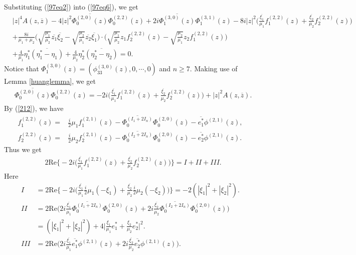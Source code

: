 \documentclass[12pt]{article}
\numberwithin{equation}{section}
\def\ov{\overline}
\begin{document}
\medskip
Substituting (\ref{97eq2}) into (\ref{97eq6}), we get
\begin{equation}\begin{split}
&|z|^4A(z,\ov{z})-4|z|^2\ov{\Phi_0^{(2,0)}(z)}\Phi_0^{(2,2)}(z)+2i\ov{\Phi_1^{(3,0)}(z)}\Phi_1^{(3,1)}(z)
-8i|z|^2\big(\frac{\ov{\xi_1}}{\mu_1}f_1^{(2,2)}(z)+\frac{\ov{\xi_2}}{\mu_2}f_2^{(2,2)}(z)\big)\\
&+\frac{8i}{\mu_1+\mu_2}\big(\sqrt{\frac{\mu_1}{\mu_2}}
\ov{z_1}\ov{\xi_2}-\sqrt{\frac{\mu_2}{\mu_1}}\ov{z_2}\ov{\xi_1}\big)\cdot
         \big(\sqrt{\frac{\mu_1}{\mu_2}}z_1f_2^{(2,2)}(z)-\sqrt{\frac{\mu_2}{\mu_1}}z_2f_1^{(2,2)}(z)\big)\\ &
         +\frac{4}{\mu_1}\eta_1^*\ov{(\eta_1^*-\eta_1)}+\frac{4}{\mu_2}\eta_2^*\ov{(\eta_2^*-\eta_2)}=0.
\end{split}\end{equation}
Notice that $\Phi_1^{(3,0)}(z)=(\phi_{33}^{(3,0)}(z),0,\cdots,0)$
and $n\ge 7$. Making use of  Lemma \ref{huanglemma}, we get
\begin{equation}\begin{split}
\label{2013 4.59} &\ov{\Phi_0^{(2,0)}(z)}\Phi_0^{(2,2)}(z)=
-2i\big(\frac{\ov{\xi_1}}{\mu_1}f_1^{(2,2)}(z)+\frac{\ov{\xi_2}}{\mu_2}f_2^{(2,2)}(z)\big)+|z|^2A(z,\ov{z}).
\end{split}\end{equation}
By (\ref{212}), we have
\begin{equation}\begin{split}
f_1^{(2,2)}(z)=&\frac{i}{2}\mu_1f_1^{(2,1)}(z)-\ov{\Phi_0^{(I_1+2I_n)}}\Phi_0^{(2,0)}(z)-\ov{e_1^*}\phi^{(2,1)}(z),\\
f_2^{(2,2)}(z)=&\frac{i}{2}\mu_2f_2^{(2,1)}(z)-\ov{\Phi_0^{(I_2+2I_n)}}\Phi_0^{(2,0)}(z)-\ov{e_2^*}\phi^{(2,1)}(z).
\end{split}\end{equation}
Thus we get
\begin{equation}\begin{split}\label{i}
&2\text{Re}\Big\{-2i\big(\frac{\ov{\xi_1}}{\mu_1}f_1^{(2,2)}(z)+\frac{\ov{\xi_2}}{\mu_2}f_2^{(2,2)}(z)\big)\Big\}=
I+II+III.
\end{split}\end{equation}
Here
\begin{equation}\begin{split}\label{ii}
I&=2\text{Re}\Big\{-2i\Big(\frac{\ov{\xi_1}}{\mu_1}\frac{i}{2}\mu_1(-\xi_1)
    +\frac{\ov{\xi_2}}{\mu_2}\frac{i}{2}\mu_2(-\xi_2)\Big)\Big\}=-2(|\xi_1|^2+|\xi_2|^2).\\
II&=2\text{Re}\Big(2i\frac{\ov{\xi_1}}{\mu_1}\ov{\Phi_0^{(I_1+2I_n)}}\Phi_0^{(2,0)}(z)
     +2i\frac{\ov{\xi_2}}{\mu_2}\ov{\Phi_0^{(I_2+2I_n)}}\Phi_0^{(2,0)}(z)\Big)\\
     &=(|\xi_1|^2+|\xi_2|^2)+4\big|\frac{\xi_1}{\mu_1}e^*_1+\frac{\xi_2}{\mu_2}e^*_2\big|^2.\\
III&=2\text{Re}\Big(2i\frac{\ov{\xi_1}}{\mu_1}\ov{e^*_1}\phi^{(2,1)}(z)
     +2i\frac{\ov{\xi_2}}{\mu_2}\ov{e^*_2}\phi^{(2,1)}(z)\Big).
\end{split}\end{equation}
\end{document}
